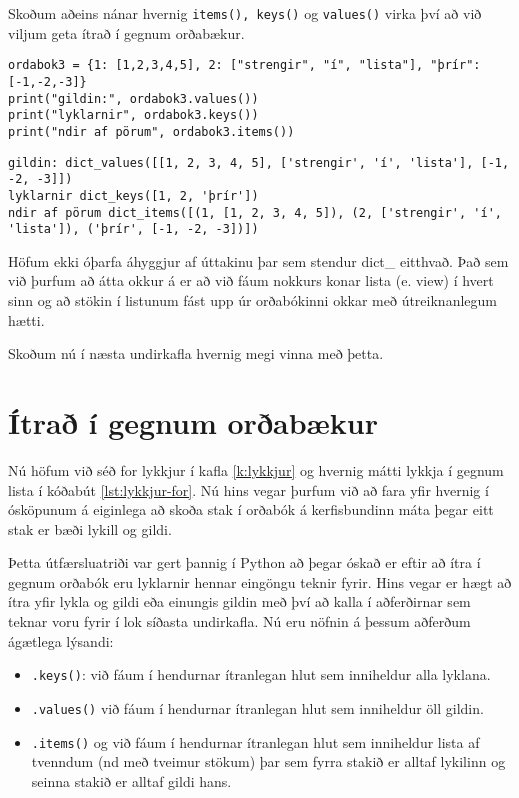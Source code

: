 Skoðum aðeins nánar hvernig \texttt{items(), keys()} og \texttt{values()} virka því að við viljum geta ítrað í gegnum orðabækur.

\begin{lstlisting}[caption=Aðferðir á orðabækur, label=lst:dict-kynnt3]
ordabok3 = {1: [1,2,3,4,5], 2: ["strengir", "í", "lista"], "þrír": [-1,-2,-3]}
print("gildin:", ordabok3.values())
print("lyklarnir", ordabok3.keys())
print("ndir af pörum", ordabok3.items())
\end{lstlisting}
\lstset{style=uttak}
\begin{lstlisting}
gildin: dict_values([[1, 2, 3, 4, 5], ['strengir', 'í', 'lista'], [-1, -2, -3]])
lyklarnir dict_keys([1, 2, 'þrír'])
ndir af pörum dict_items([(1, [1, 2, 3, 4, 5]), (2, ['strengir', 'í', 'lista']), ('þrír', [-1, -2, -3])])
\end{lstlisting}
\lstset{style=venjulegt}

Höfum ekki óþarfa áhyggjur af úttakinu þar sem stendur dict\_ eitthvað.
Það sem við þurfum að átta okkur á er að við fáum nokkurs konar lista (e. view) í hvert sinn og að stökin í listunum fást upp úr orðabókinni okkar með útreiknanlegum hætti.

Skoðum nú í næsta undirkafla hvernig megi vinna með þetta.

\section{Ítrað í gegnum orðabækur}

Nú höfum við séð for lykkjur í kafla \ref{k:lykkjur} og hvernig mátti lykkja í gegnum lista í kóðabút \ref{lst:lykkjur-for}.
Nú hins vegar þurfum við að fara yfir hvernig í ósköpunum á eiginlega að skoða stak í orðabók á kerfisbundinn máta þegar eitt stak er bæði lykill og gildi.

Þetta útfærsluatriði var gert þannig í Python að þegar óskað er eftir að ítra í gegnum orðabók eru lyklarnir hennar eingöngu teknir fyrir.
Hins vegar er hægt að ítra yfir lykla og gildi eða einungis gildin með því að kalla í aðferðirnar sem teknar voru fyrir í lok síðasta undirkafla.
Nú eru nöfnin á þessum aðferðum ágætlega lýsandi:

\begin{itemize}
	\item \texttt{.keys()}: við fáum í hendurnar ítranlegan hlut sem inniheldur alla lyklana.
	\item \texttt{.values()} við fáum í hendurnar ítranlegan hlut sem inniheldur öll gildin.
	\item \texttt{.items()} og  við fáum í hendurnar ítranlegan hlut sem inniheldur lista af tvenndum (nd með tveimur stökum) þar sem fyrra stakið er alltaf lykilinn og seinna stakið er alltaf gildi hans.
\end{itemize}


